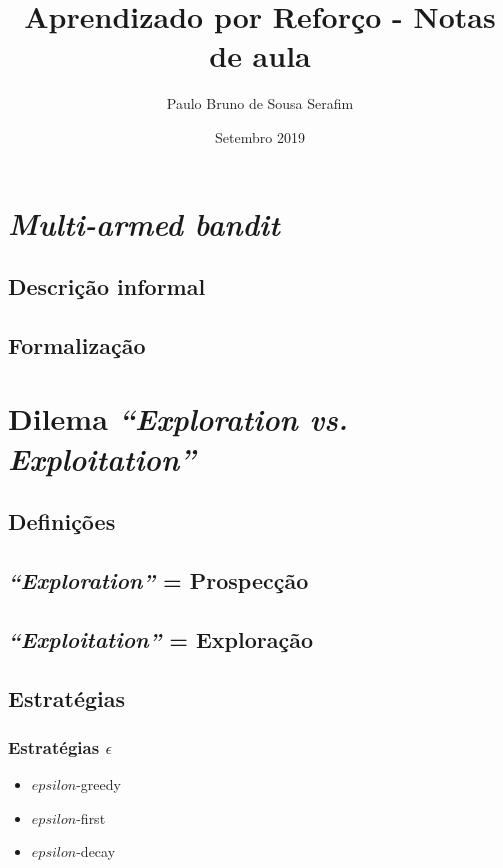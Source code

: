 \documentclass{article}
\title{Aprendizado por Reforço - Notas de aula}
\author{Paulo Bruno de Sousa Serafim}
\date{Setembro 2019}
\begin{document}
\maketitle

\section{\textit{Multi-armed bandit}}

    \subsection{Descrição informal}
    
    \subsection{Formalização}

\section{Dilema \textit{``Exploration vs. Exploitation''}}

    \subsection{Definições}
    
        \subsection{\textit{``Exploration''} = Prospecção}
        
        \subsection{\textit{``Exploitation''} = Exploração}
    
    \subsection{Estratégias}
    
        \subsubsection{Estratégias $\epsilon$}
        
            \begin{itemize}
                \item $epsilon$-greedy
                \item $epsilon$-first
                \item $epsilon$-decay
            \end{itemize}
        
\end{document}

